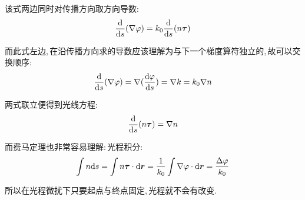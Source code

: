 该式两边同时对传播方向取方向导数:
\[\frac{\textrm{d}}{\textrm{d} s}(\nabla\varphi)=k_0\frac{\textrm{d}}{\textrm{d} s}(n\boldsymbol{\tau})\]

而此式左边,\,在沿传播方向求的导数应该理解为与下一个梯度算符独立的,\,故可以交换顺序:
\[\frac{\textrm{d}}{\textrm{d} s}(\nabla\varphi)=\nabla(\frac{\textrm{d} \varphi}{\textrm{d} s})=\nabla{k}=k_0\nabla{n}\]

两式联立便得到光线方程:
\[\frac{\textrm{d}}{\textrm{d} s}(n\boldsymbol{\tau})=\nabla n\]

而费马定理也非常容易理解:\,光程积分:
\[\int n\textrm{d} s=\int n\boldsymbol{\tau}\cdot \textrm{d} \boldsymbol{r}=\frac{1}{k_0}\int \nabla \varphi\cdot \textrm{d} \boldsymbol{r}=\frac{\Delta \varphi}{k_0}\]

所以在光程微扰下只要起点与终点固定,\,光程就不会有改变.
